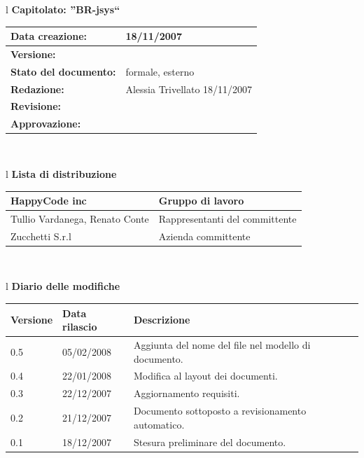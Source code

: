 \documentclass[11pt,titlepage,a4paper]{report}
\begin{document}
\begin{center}
\thispagestyle{plain}
\begin{table}[htbp]
\large{
\begin{tabular}{l}
\Large{\textbf{\textsf{Capitolato: ''BR-jsys``}}} \\
\begin{tabular}{||p{6cm}||p{6cm}||} \hline
\textbf{Data creazione:} & 18/11/2007 \\ \hline
\textbf{Versione:} & \lv \\ \hline
\textbf{Stato del documento:} & formale, esterno \\ \hline
\textbf{Redazione:} & Alessia Trivellato ­18/11/2007 \\ \hline
\textbf{Revisione:} &    \\ \hline
\textbf{Approvazione:}  & \\ \hline
\end{tabular} \\
\end{tabular}
}
\end{table}
\begin{table}[hbtp]
\large{
\begin{tabular}{l}
\Large{\textbf{\textsf{Lista di distribuzione}}} \\
\begin{tabular}{||p{6cm}||p{6cm}||} \hline
{HappyCode inc}& Gruppo di lavoro\\ \hline
{Tullio Vardanega, Renato Conte}& Rappresentanti del committente \\ \hline 
{Zucchetti S.r.l}& Azienda committente\\ \hline
\end{tabular} \\
\end{tabular}
}
\end{table}

\begin{table}[hbtp]
\large{
\begin{tabular}{l}
\Large{\textbf{\textsf{Diario delle modifiche}}} \\
\begin{tabular}{||p{2cm}||p{3.5cm}||p{6cm}||} \hline
\textbf{Versione} & \textbf{Data rilascio} & \textbf{Descrizione} \\ \hline
0.5 & 05/02/2008 & Aggiunta del nome del file nel modello di documento.\\ \hline
0.4 & 22/01/2008 & Modifica al layout dei documenti.\\ \hline
0.3 & 22/12/2007 & Aggiornamento requisiti. \\ \hline \hline
0.2 & 21/12/2007 & Documento sottoposto a revisionamento automatico.\\ \hline
0.1 & 18/12/2007 & Stesura preliminare del documento. \\ \hline


\end{tabular}
\end{tabular}}
\end{table}
\end{center}
\end{document}
